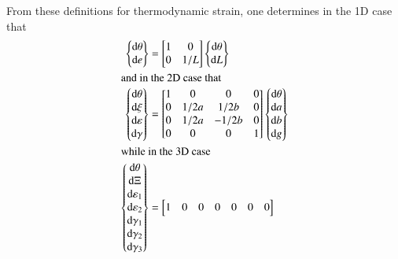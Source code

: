 From these definitions for thermo\-dynamic strain, one determines in the 1D case that
\begin{subequations}
    \label{strainGradient}
    \begin{align}
    \left\{ \begin{matrix}
    \mathrm{d} \theta \\ \mathrm{d} e
    \end{matrix} \right\} & = \begin{bmatrix}
    1 & 0 \\ 0 & 1/L
    \end{bmatrix} \left\{ \begin{matrix}
    \mathrm{d} \theta \\ \mathrm{d} L
    \end{matrix} \right\} \\
    \intertext{and in the 2D case that}
    \left\{ \begin{matrix}
    \mathrm{d} \theta \\ \mathrm{d} \xi \\ 
    \mathrm{d} \varepsilon \\ \mathrm{d} \gamma
    \end{matrix} \right\} & = \begin{bmatrix}
    1 & 0 & 0 & 0 \\ 0 & 1/2a & 1/2b & 0 \\ 0 & 1/2a & -1/2b & 0 \\ 0 & 0 & 0 & 1
    \end{bmatrix} \left\{ \begin{matrix}
    \mathrm{d} \theta \\ \mathrm{d} a \\ 
    \mathrm{d} b \\ \mathrm{d} g
    \end{matrix} \right\} \\
    \intertext{while in the 3D case}
    \left\{ \begin{matrix}
    \mathrm{d} \theta \\ \mathrm{d} \Xi \\ 
    \mathrm{d} \varepsilon_1 \\ \mathrm{d} \varepsilon_2 \\ 
    \mathrm{d} \gamma_1 \\ \mathrm{d} \gamma_2 \\ \mathrm{d} \gamma_3
    \end{matrix} \right\} & = \begin{bmatrix}
    1 & 0 & 0 & 0 & 0 & 0 & 0 \\

\end{bmatrix}
\end{align}
\end{subequations}
